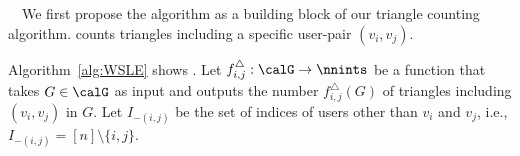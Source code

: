 {}~~We first 
propose 
the \AlgWSLE{} algorithm 
as a building block of our triangle counting algorithm. 
\AlgWSLE{} counts 
triangles including a specific user-pair $(v_i,v_j)$. 

Algorithm~\ref{alg:WSLE} shows \AlgWSLE{}. 
Let $f_{i,j}^\triangle: \calG \rightarrow \nnints$ be a function that takes $G \in \calG$ as input and outputs the number $f_{i,j}^\triangle(G)$ of triangles including $(v_i,v_j)$ in $G$. 
Let $I_{-(i,j)}$ be the set of indices of users other than $v_i$ and $v_j$, i.e., $I_{-(i,j)} = [n]\setminus\{i,j\}$. 

